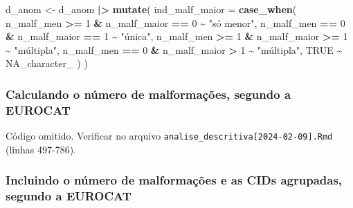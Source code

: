 \documentclass[
]{article}
\newenvironment{Shaded}{\begin{snugshade}}{\end{snugshade}}
\newcommand{\AttributeTok}[1]{\textcolor[rgb]{0.13,0.29,0.53}{#1}}
\newcommand{\ConstantTok}[1]{\textcolor[rgb]{0.56,0.35,0.01}{#1}}
\newcommand{\DecValTok}[1]{\textcolor[rgb]{0.00,0.00,0.81}{#1}}
\newcommand{\FunctionTok}[1]{\textcolor[rgb]{0.13,0.29,0.53}{\textbf{#1}}}
\newcommand{\NormalTok}[1]{#1}
\newcommand{\OtherTok}[1]{\textcolor[rgb]{0.56,0.35,0.01}{#1}}
\newcommand{\SpecialCharTok}[1]{\textcolor[rgb]{0.81,0.36,0.00}{\textbf{#1}}}
\newcommand{\StringTok}[1]{\textcolor[rgb]{0.31,0.60,0.02}{#1}}
\begin{document}
\begin{Shaded}
\begin{Highlighting}[]
\NormalTok{d\_anom }\OtherTok{\textless{}{-}}\NormalTok{ d\_anom }\SpecialCharTok{|\textgreater{}} 
  \FunctionTok{mutate}\NormalTok{(}
    \AttributeTok{ind\_malf\_maior =} \FunctionTok{case\_when}\NormalTok{(}
\NormalTok{    n\_malf\_men }\SpecialCharTok{\textgreater{}=} \DecValTok{1} \SpecialCharTok{\&}\NormalTok{ n\_malf\_maior }\SpecialCharTok{==} \DecValTok{0} \SpecialCharTok{\textasciitilde{}} \StringTok{"só menor"}\NormalTok{,}
\NormalTok{    n\_malf\_men }\SpecialCharTok{==} \DecValTok{0} \SpecialCharTok{\&}\NormalTok{ n\_malf\_maior }\SpecialCharTok{==} \DecValTok{1} \SpecialCharTok{\textasciitilde{}} \StringTok{"única"}\NormalTok{,}
\NormalTok{    n\_malf\_men }\SpecialCharTok{\textgreater{}=} \DecValTok{1} \SpecialCharTok{\&}\NormalTok{ n\_malf\_maior }\SpecialCharTok{\textgreater{}=} \DecValTok{1} \SpecialCharTok{\textasciitilde{}} \StringTok{"múltipla"}\NormalTok{,}
\NormalTok{    n\_malf\_men }\SpecialCharTok{==} \DecValTok{0} \SpecialCharTok{\&}\NormalTok{ n\_malf\_maior }\SpecialCharTok{\textgreater{}} \DecValTok{1} \SpecialCharTok{\textasciitilde{}} \StringTok{"múltipla"}\NormalTok{,}
    \ConstantTok{TRUE} \SpecialCharTok{\textasciitilde{}} \ConstantTok{NA\_character\_}
\NormalTok{   )}
\NormalTok{ )}
\end{Highlighting}
\end{Shaded}

\hypertarget{calculando-o-nuxfamero-de-malformauxe7uxf5es-segundo-a-eurocat}{%
\subsubsection{Calculando o número de malformações, segundo a
EUROCAT}\label{calculando-o-nuxfamero-de-malformauxe7uxf5es-segundo-a-eurocat}}

Código omitido. Verificar no arquivo
\texttt{analise\_descritiva{[}2024-02-09{]}.Rmd} (linhas 497-786).

\hypertarget{incluindo-o-nuxfamero-de-malformauxe7uxf5es-e-as-cids-agrupadas-segundo-a-eurocat}{%
\subsubsection{Incluindo o número de malformações e as CIDs agrupadas,
segundo a
EUROCAT}\label{incluindo-o-nuxfamero-de-malformauxe7uxf5es-e-as-cids-agrupadas-segundo-a-eurocat}}
\end{document}
